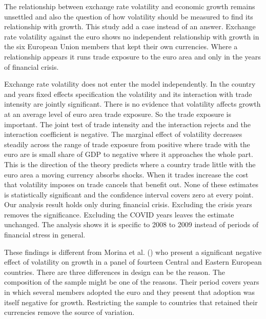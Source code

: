 \label{sec:conclusion}

The relationship between exchange rate volatility and economic growth remains unsettled and also the question of how volatility should be measured to find its relationship with growth.
This study add a case instead of an answer.
Exchange rate volatility against the euro shows no independent relationship with growth in the six European Union members that kept their own currencies.
Where a relationship appears it runs trade exposure to the euro area and only in the years of financial crisis.

\vspace{\baselineskip}

Exchange rate volatility does not enter the model independently.
In the country and years fixed effects specification the volatility and its interaction with trade intensity are jointly significant.
There is no evidence that volatility affects growth at an average level of euro area trade exposure.
So the trade exposure is important. 
The joint test of trade intensity and the interaction rejects and the interaction coefficient is negative.
The marginal effect of volatility decreases steadily across the range of trade exposure from positive where trade with the euro are is small share of GDP to negative where it approaches the whole part.
This is the direction of the theory predicts where a country trade little with the euro area a moving currency absorbs shocks.
When it trades increase the cost that volatility imposes on trade cancels that benefit out.
None of these estimates is statistically significant and the confidence interval covers zero at every point.
Our analysis result holds only during financial crisis.
Excluding the crisis years removes the significance.
Excluding the COVID years leaves the estimate unchanged.
The analysis shows it is specific to 2008 to 2009 instead of periods of financial stress in general.

\vspace{\baselineskip}

These findings is different from Morina et al. (\citeyear{morina_effect_2020}) who present a significant negative effect of volatility on growth in a panel of fourteen Central and Eastern European countries.
There are three differences in design can be the reason.
The composition of the sample might be one of the reasons.
Their period covers years in which several members adopted the euro and they present that adoption was itself negative for growth.
Restricting the sample to countries that retained their currencies remove the source of variation.

